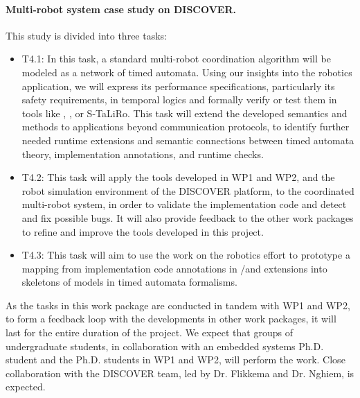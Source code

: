 \paragraph {Multi-robot system case study on DISCOVER.} This study is divided into three tasks:
\noindent \begin{itemize}[labelsep=3pt,leftmargin=12pt]
\item T4.1: In this task, a standard multi-robot coordination
  algorithm %
  will be modeled as a network of timed automata.  Using our insights
  into the robotics application, we will express its performance
  specifications, particularly its safety requirements, in temporal
  logics and formally verify or test them in tools like \uppaal,
  \prism, or S-TaLiRo.  This task will extend the developed semantics
  and methods to applications beyond communication protocols, to
  identify further needed runtime extensions and semantic connections
  between timed automata theory, implementation annotations, and
  runtime checks.
\item T4.2: This task will apply the tools developed in WP1 and WP2,
  and the robot simulation environment of the DISCOVER platform, to
  the coordinated multi-robot system, in order to validate the
  implementation code and detect and fix possible bugs.  It will also
  provide feedback to the other work packages to refine and improve
  the tools developed in this project.
\item T4.3: This task will aim to use the work on the robotics effort
  to prototype a mapping from implementation code annotations in
  \acsl/\eacsl and extensions into skeletons of models in timed
  automata formalisms.
  \end{itemize}

As the tasks in this work package are conducted in tandem with WP1 and WP2, to form a feedback loop with the developments in other work packages, it will last for the entire duration of the project.
We expect that groups of undergraduate students, in collaboration with
an embedded systems Ph.D. student and the Ph.D. students in WP1 and WP2, will
perform the work.
Close collaboration with the DISCOVER team, led by Dr. Flikkema and Dr. Nghiem, is expected.

